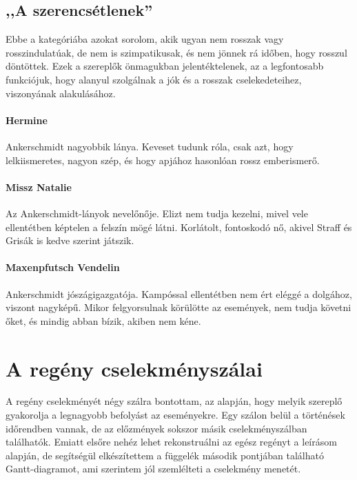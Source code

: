 \documentclass{thesis-ekf}
\begin{document}
    \subsection{,,A szerencsétlenek''}

    Ebbe a kategóriába azokat sorolom, akik ugyan nem rosszak vagy rosszindulatúak, de nem is szimpatikusak,
        és nem jönnek rá időben, hogy rosszul döntöttek.
    Ezek a szereplők önmagukban jelentéktelenek, az a legfontosabb funkciójuk, hogy alanyul szolgálnak
        a jók és a rosszak cselekedeteihez, viszonyának alakulásához.

    \paragraph{Hermine}
    Ankerschmidt nagyobbik lánya.
    Keveset tudunk róla, csak azt, hogy lelkiismeretes, nagyon szép, és hogy apjához hasonlóan rossz emberismerő.

    \paragraph{Missz Natalie}
    Az Ankerschmidt-lányok nevelőnője.
    Elizt nem tudja kezelni, mivel vele ellentétben képtelen a felszín mögé látni.
    Korlátolt, fontoskodó nő, akivel Straff és Grisák is kedve szerint játszik.

    \paragraph{Maxenpfutsch Vendelin}
    Ankerschmidt jószágigazgatója.
    Kampóssal ellentétben nem ért eléggé a dolgához, viszont nagyképű.
    Mikor felgyorsulnak körülötte az események, nem tudja követni őket, és mindig abban bízik, akiben nem kéne.

    \section{A regény cselekményszálai}

    A regény cselekményét négy szálra bontottam, az alapján, hogy melyik szereplő gyakorolja a legnagyobb befolyást az eseményekre.
    Egy szálon belül a történések időrendben vannak, de az előzmények sokszor másik cselekményszálban találhatók.
    Emiatt elsőre nehéz lehet rekonstruálni az egész regényt a leírásom alapján, de segítségül elkészítettem
        a függelék második pontjában található Gantt-diagramot, ami szerintem jól szemlélteti a cselekmény menetét.
\end{document}
